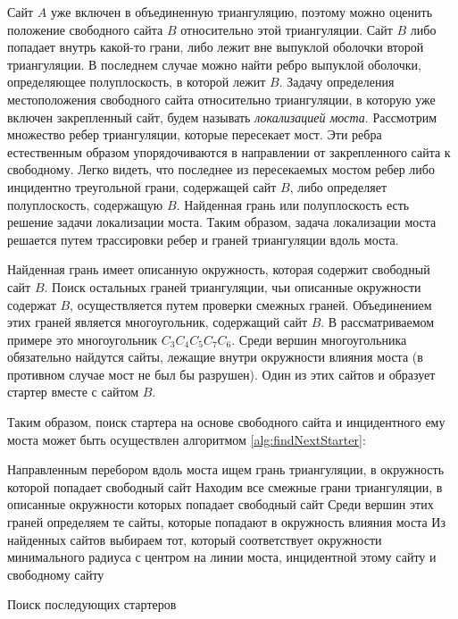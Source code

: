 \documentclass[12pt]{article}
\begin{document}
Сайт $A$ уже включен в объединенную триангуляцию,
поэтому можно оценить положение свободного сайта $B$ относительно этой триангуляции.
Сайт $B$ либо попадает внутрь какой-то грани, либо лежит вне выпуклой оболочки второй триангуляции.
В последнем случае можно найти ребро выпуклой оболочки, определяющее полуплоскость, в которой лежит $B$.
Задачу определения местоположения свободного сайта относительно триангуляции,
в которую уже включен закрепленный сайт, будем называть {\itshape локализацией моста}.
Рассмотрим множество ребер триангуляции, которые пересекает мост.
Эти ребра естественным образом упорядочиваются в направлении от закрепленного сайта к свободному.
Легко видеть, что последнее из пересекаемых мостом ребер либо инцидентно треугольной грани,
содержащей сайт $B$, либо определяет полуплоскость, содержащую $B$.
Найденная грань или полуплоскость есть решение задачи локализации моста.
Таким образом, задача локализации моста решается путем трассировки ребер и граней триангуляции вдоль моста.

Найденная грань имеет описанную окружность, которая содержит свободный сайт $B$.
Поиск остальных граней триангуляции, чьи описанные окружности содержат $B$,
осуществляется путем проверки смежных граней.
Объединением этих граней является многоугольник, содержащий сайт $B$.
В рассматриваемом примере это многоугольник $C_3C_4C_5C_7C_6$.
Среди вершин многоугольника обязательно найдутся сайты,
лежащие внутри окружности влияния моста (в противном случае мост не был бы разрушен).
Один из этих сайтов и образует стартер вместе с сайтом $B$.

Таким образом, поиск стартера на основе свободного сайта и инцидентного ему моста
может быть осуществлен алгоритмом \ref{alg:findNextStarter}:

\begin{algorithm}[htb!]
\begin{algorithmic}[1]
	\State Направленным перебором вдоль моста ищем грань триангуляции, в окружность которой попадает свободный сайт
	\State Находим все смежные грани триангуляции, в описанные окружности которых попадает свободный сайт
	\State Среди вершин этих граней определяем те сайты, которые попадают в окружность влияния моста
	\State Из найденных сайтов выбираем тот, который соответствует окружности минимального радиуса с центром на линии моста,
		инцидентной этому сайту и свободному сайту
\EndProcedure
\end{algorithmic}
\caption{Поиск последующих стартеров}
\label{alg:findNextStarter}
\end{algorithm}
\end{document}
